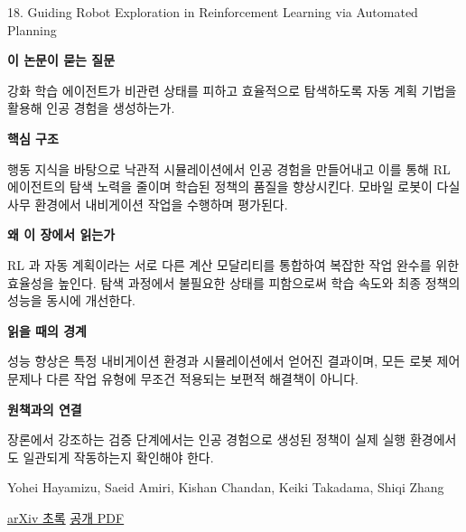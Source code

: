 \documentclass[11pt,openany]{book}
\begin{document}
\begin{termcard}{18. Guiding Robot Exploration in Reinforcement Learning via Automated Planning}

\par

\medskip

{\sffamily\bfseries\color{deepblue} 이 논문이 묻는 질문}\par

강화 학습 에이전트가 비관련 상태를 피하고 효율적으로 탐색하도록 자동 계획 기법을 활용해 인공 경험을 생성하는가.

\smallskip

{\sffamily\bfseries\color{deepblue} 핵심 구조}\par

행동 지식을 바탕으로 낙관적 시뮬레이션에서 인공 경험을 만들어내고 이를 통해 RL 에이전트의 탐색 노력을 줄이며 학습된 정책의 품질을 향상시킨다. 모바일 로봇이 다실 사무 환경에서 내비게이션 작업을 수행하며 평가된다.

\smallskip

{\sffamily\bfseries\color{deepblue} 왜 이 장에서 읽는가}\par

RL 과 자동 계획이라는 서로 다른 계산 모달리티를 통합하여 복잡한 작업 완수를 위한 효율성을 높인다. 탐색 과정에서 불필요한 상태를 피함으로써 학습 속도와 최종 정책의 성능을 동시에 개선한다.

\smallskip

{\sffamily\bfseries\color{coral} 읽을 때의 경계}\par

성능 향상은 특정 내비게이션 환경과 시뮬레이션에서 얻어진 결과이며, 모든 로봇 제어 문제나 다른 작업 유형에 무조건 적용되는 보편적 해결책이 아니다.

\smallskip

{\sffamily\bfseries\color{teal} 원책과의 연결}\par

장론에서 강조하는 검증 단계에서는 인공 경험으로 생성된 정책이 실제 실행 환경에서도 일관되게 작동하는지 확인해야 한다.

\medskip

{\footnotesize\color{muted} Yohei Hayamizu, Saeid Amiri, Kishan Chandan, Keiki Takadama, Shiqi Zhang\par

\href{https://arxiv.org/abs/2004.11456}{arXiv 초록} \quad \href{https://arxiv.org/pdf/2004.11456}{공개 PDF}\par}

\end{termcard}
\end{document}
